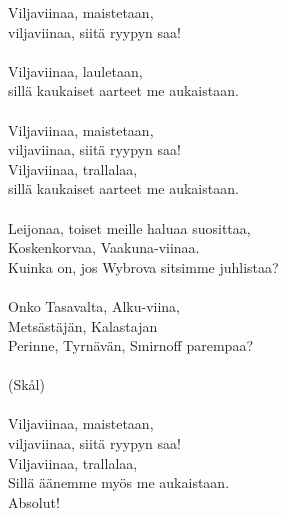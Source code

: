 
Viljaviinaa, maistetaan, \\ viljaviinaa, siitä ryypyn saa! \\ \hspace{10mm} \\ Viljaviinaa, lauletaan, \\ sillä kaukaiset aarteet me aukaistaan. \\ \hspace{10mm} \\ Viljaviinaa, maistetaan, \\ viljaviinaa, siitä ryypyn saa! \\ Viljaviinaa, trallalaa, \\ sillä kaukaiset aarteet me aukaistaan. \\ \hspace{10mm} \\ Leijonaa, toiset meille haluaa suosittaa, \\ Koskenkorvaa, Vaakuna-viinaa. \\ Kuinka on, jos Wybrova sitsimme juhlistaa? \\ \hspace{10mm} \\ Onko Tasavalta, Alku-viina, \\ Metsästäjän, Kalastajan \\ Perinne, Tyrnävän, Smirnoff parempaa? \\ \hspace{10mm} \\ (Skål) \\ \hspace{10mm} \\ Viljaviinaa, maistetaan, \\ viljaviinaa, siitä ryypyn saa! \\ Viljaviinaa, trallalaa, \\ Sillä äänemme myös me aukaistaan. \\ Absolut!